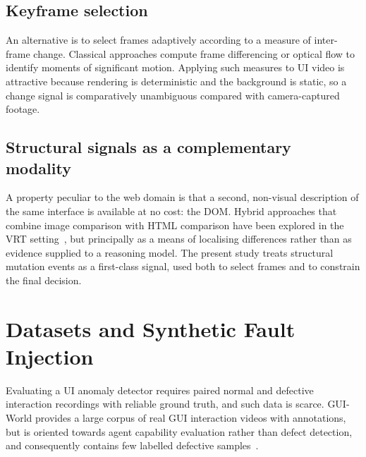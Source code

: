 \subsection{Keyframe selection}
\label{sec:input-keyframe}

An alternative is to select frames adaptively according to a measure of
inter-frame change. Classical approaches compute frame differencing or
optical flow to identify moments of significant motion. Applying such
measures to UI video is attractive because rendering is deterministic and
the background is static, so a change signal is comparatively
unambiguous compared with camera-captured footage.

\subsection{Structural signals as a complementary modality}
\label{sec:input-dom}

A property peculiar to the web domain is that a second, non-visual
description of the same interface is available at no cost: the DOM.
Hybrid approaches that combine image comparison with HTML comparison have
been explored in the VRT setting~\citep{amano2021mixvrt}, but principally
as a means of localising differences rather than as evidence supplied to a
reasoning model. The present study treats structural mutation events as a
first-class signal, used both to select frames and to constrain the final
decision.


\section{Datasets and Synthetic Fault Injection}
\label{sec:datasets}

Evaluating a UI anomaly detector requires paired normal and defective
interaction recordings with reliable ground truth, and such data is
scarce. GUI-World provides a large corpus of real GUI interaction videos
with annotations, but is oriented towards agent capability evaluation
rather than defect detection, and consequently contains few labelled
defective samples~\citep{guiworld}.

